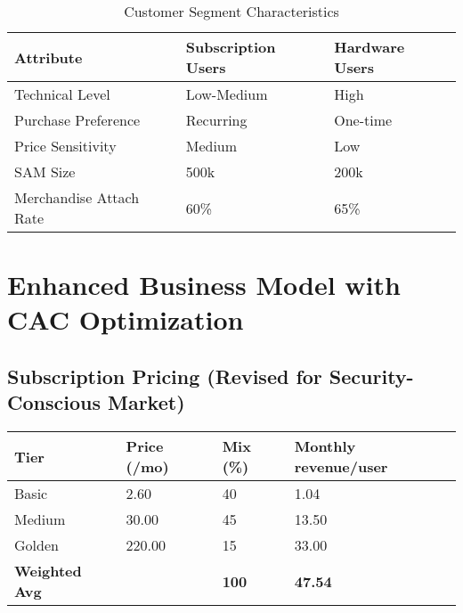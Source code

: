 \documentclass[11pt]{article}
\newcommand{\subBasicPrice}{2.60}
\newcommand{\subBasicMix}{40}
\newcommand{\subMediumPrice}{30.00}
\newcommand{\subMediumMix}{45}
\newcommand{\subGoldenPrice}{220.00}
\newcommand{\subGoldenMix}{15}
\newcommand{\merchAttachRate}{60}
\newcommand{\samSubs}{500k}
\newcommand{\samHw}{200k}
\begin{document}
\begin{table}[H]
\centering
\caption{Customer Segment Characteristics}
\begin{tabularx}{\linewidth}{l X X}
\toprule
Attribute & Subscription Users & Hardware Users \\\midrule
Technical Level & Low-Medium & High \\
Purchase Preference & Recurring & One-time \\
Price Sensitivity & Medium & Low \\
SAM Size & \samSubs\cite{chainalysis2024,triple2023} & \samHw\cite{chainalysis2024,triple2023} \\
Merchandise Attach Rate & \merchAttachRate\%\cite{shopify2024} & 65\%\cite{shopify2024} \\
\bottomrule
\end{tabularx}
\end{table}

\section{Enhanced Business Model with CAC Optimization}

\subsection{Subscription Pricing (Revised for Security-Conscious Market)}
\begin{table}[H]
\centering
\begin{tabularx}{\linewidth}{l Y Y Y}
\toprule
Tier & Price (/mo) & Mix (\%) & Monthly revenue/user \\\midrule
Basic   & \subBasicPrice  & \subBasicMix & 1.04 \\
Medium  & \subMediumPrice & \subMediumMix & 13.50 \\
Golden  & \subGoldenPrice & \subGoldenMix & 33.00 \\\midrule
\textbf{Weighted Avg} &  & \textbf{100} & \textbf{47.54} \\
\bottomrule
\end{tabularx}
\end{table}
\end{document}
